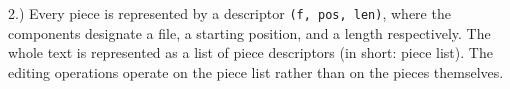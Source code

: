 2.) Every piece is represented by a descriptor {\tt (f, pos, len)\/}, where
the components designate a file, a starting position, and a length
respectively. The whole text is represented as a list of piece
descriptors (in short: piece list). The editing operations operate on
the piece list rather than on the pieces themselves.



\bye
